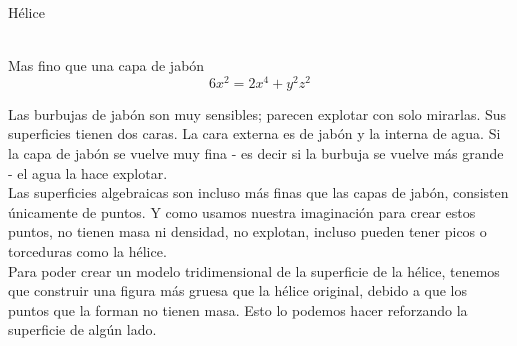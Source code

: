 \documentclass[es]{SurferDesc}%
\begin{document}
\footnotesize


\begin{surferPage}
  \begin{surferTitle}Hélice\end{surferTitle}   \\
Mas fino que una capa de jabón\\
  \smallskip
\[6x^2	= 2x^4	+ y^2	z^2\]

\singlespacing
Las burbujas de jabón son muy sensibles; parecen explotar con solo mirarlas. Sus superficies tienen dos caras. La cara externa es de jabón y la interna de agua. Si la capa de jabón se vuelve muy fina - es decir si la burbuja se vuelve más grande - el agua la hace explotar.\\
\vspace{0,3cm}
Las superficies algebraicas son incluso más finas que las capas de jabón, consisten únicamente de puntos. Y como usamos nuestra imaginación para crear estos puntos, no tienen masa ni densidad, no explotan, incluso pueden tener picos o torceduras como la hélice.\\
\vspace{0,3cm}
Para poder crear un modelo tridimensional de la superficie de la hélice, tenemos que construir una figura más gruesa que la hélice original, debido a que los puntos que la forman no tienen masa. Esto lo podemos hacer reforzando la superficie de algún lado.

  \begin{surferText}
     \end{surferText}
\end{surferPage}



 
\end{document}
